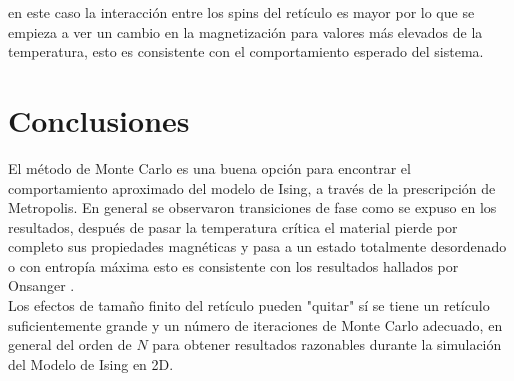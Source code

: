 \documentclass[a4paper]{article}
\begin{document}
en este caso la interacción entre los spins del retículo es mayor por lo que se empieza a ver un cambio en la magnetización para valores más elevados de la temperatura, esto es consistente con el comportamiento esperado del sistema.



\section{Conclusiones}
El método de Monte Carlo es una buena opción para encontrar el comportamiento aproximado del modelo de Ising, a través de la prescripción de Metropolis. En general se observaron transiciones de fase como se expuso en los resultados, después de pasar la temperatura crítica el material pierde por completo sus propiedades magnéticas y pasa a un estado totalmente desordenado o con entropía máxima esto es consistente con los resultados hallados por Onsanger \cite{Onsanger}.\\

Los efectos de tamaño finito del retículo pueden "quitar" sí se tiene un retículo suficientemente grande y un número de iteraciones de Monte Carlo adecuado, en general del orden de $N$ para obtener resultados razonables durante la simulación del Modelo de Ising en 2D.\\
\end{document}
